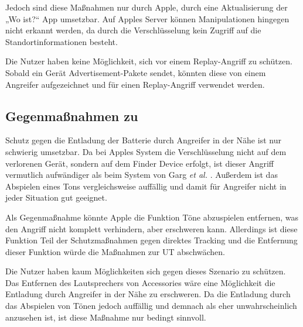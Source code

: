 Jedoch sind diese Maßnahmen nur durch Apple, durch eine Aktualisierung der „Wo ist?“ App umsetzbar. 
Auf Apples Server können Manipulationen hingegen nicht erkannt werden, da durch die Verschlüsselung kein Zugriff auf die Standortinformationen besteht.

Die Nutzer haben keine Möglichkeit, sich vor einem Replay-Angriff zu schützen.
Sobald ein Gerät Advertisement-Pakete sendet, könnten diese von einem Angreifer aufgezeichnet und für einen Replay-Angriff verwendet werden.


\subsection{Gegenmaßnahmen zu }

Schutz gegen die Entladung der Batterie durch Angreifer in der Nähe ist nur schwierig umsetzbar.
Da bei Apples System die Verschlüsselung nicht auf dem verlorenen Gerät, sondern auf dem Finder Device erfolgt, ist dieser Angriff vermutlich aufwändiger als beim System von Garg \textit{et al.} \cite{Garg_Secure_Tracker}.
Außerdem ist das Abspielen eines Tons vergleichsweise auffällig und damit für Angreifer nicht in jeder Situation gut geeignet.

Als Gegenmaßnahme könnte Apple die Funktion Töne abzuspielen entfernen, was den Angriff nicht komplett verhindern, aber erschweren kann.
Allerdings ist diese Funktion Teil der Schutzmaßnahmen gegen direktes Tracking und die Entfernung dieser Funktion würde die Maßnahmen zur \ac{UT} abschwächen.

Die Nutzer haben kaum Möglichkeiten sich gegen dieses Szenario zu schützen. 
Das Entfernen des Lautsprechers von Accessories wäre eine Möglichkeit die Entladung durch Angreifer in der Nähe zu erschweren.
Da die Entladung durch das Abspielen von Tönen jedoch auffällig und demnach als eher unwahrscheinlich anzusehen ist, ist diese Maßnahme nur bedingt sinnvoll.



